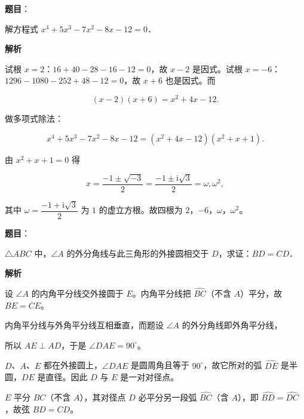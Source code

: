 \begin{answer}

\textbf{题目}：

解方程式 $x^4+5x^3-7x^2-8x-12=0$．

\textbf{解析}

试根 $x=2$：$16+40-28-16-12=0$，故 $x-2$ 是因式。试根 $x=-6$：$1296-1080-252+48-12=0$，故 $x+6$ 也是因式。而

\nopagebreak[4]
\[
(x-2)(x+6)=x^2+4x-12.
\]

做多项式除法：

\nopagebreak[4]
\[
x^4+5x^3-7x^2-8x-12=(x^2+4x-12)(x^2+x+1).
\]

由 $x^2+x+1=0$ 得

\nopagebreak[4]
\[
x=\dfrac{-1\pm\sqrt{-3}}{2}=\dfrac{-1\pm\mathrm i\sqrt3}{2}=\omega,\omega^2,
\]

其中 $\omega=\dfrac{-1+\mathrm i\sqrt3}{2}$ 为 $1$ 的虚立方根。故四根为 $2$，$-6$，$\omega$，$\omega^2$。


\end{answer}
\begin{answer}

\textbf{题目}：

$\triangle ABC$ 中，$\angle A$ 的外分角线与此三角形的外接圆相交于 $D$，求证：$BD=CD$．

\textbf{解析}

设 $\angle A$ 的内角平分线交外接圆于 $E$。内角平分线把 $\widehat{BC}$（不含 $A$）平分，故 $BE=CE$。

内角平分线与外角平分线互相垂直，而题设 $\angle A$ 的外分角线即外角平分线，

所以 \mbox{$AE\perp AD$}，于是 \mbox{$\angle DAE=90^\circ$}。

$D$、$A$、$E$ 都在外接圆上，$\angle DAE$ 是圆周角且等于 $90^\circ$，故它所对的弧 $\widehat{DE}$ 是半圆，$DE$ 是直径。因此 $D$ 与 $E$ 是一对对径点。

$E$ 平分 $\widehat{BC}$（不含 $A$），其对径点 $D$ 必平分另一段弧 $\widehat{BC}$（含 $A$），即 $\widehat{BD}=\widehat{DC}$，故弦 $BD=CD$。


\end{answer}

